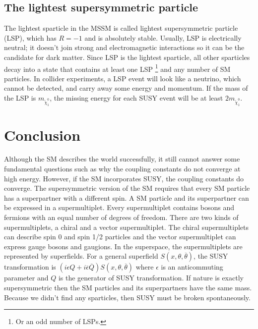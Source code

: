 \documentclass[12pt]{report}
\begin{document}
\section{The lightest supersymmetric particle}
The lightest sparticle in the MSSM is called lightest supersymmetric particle (LSP), which has $R = -1$ and is absolutely stable.
Usually, LSP is electrically neutral; it doesn't join strong and electromagnetic interactions so it can be the candidate for dark matter.
Since LSP is the lightest sparticle, all other sparticles decay into a state that contains at least one LSP \footnote{Or an odd number of LSPs.} and any number of SM particles.
In collider experiments, a LSP event will look like a neutrino, which cannot be detected, and carry away some energy and momentum.
If the mass of the LSP is $m_{\widetilde{\chi}^{0}_{1}}$, the missing energy for each SUSY event will be at least $2 m_{\widetilde{\chi}^{0}_{1}}$. %













\chapter{Conclusion}
Although the SM describes the world successfully, it still cannot answer some fundamental questions such as why the coupling constants do not converge at high energy.
However, if the SM incorporates SUSY, the coupling constants do converge.
The supersymmetric version of the SM requires that every SM particle has a superpartner with a different spin.
A SM particle and its superpartner can be expressed in a supermultiplet.
Every supermultiplet contains bosons and fermions with an equal number of degrees of freedom.
There are two kinds of supermultiplets, a chiral and a vector supermultiplet.
The chiral supermultiplets can describe spin 0 and spin 1/2 particles and the vector supermultiplet can express gauge bosons and gaugions.
In the superspace, the supermultiplets are represented by superfields.
For a general superfield $S(x, \theta, \overline{\theta})$, the SUSY transformation is $(i \epsilon Q + i \overline{\epsilon} \overline{Q}) S(x, \theta, \overline{\theta})$ where $\epsilon$ is an anticommuting parameter and $Q$ is the generator of SUSY transformation.
If nature is exactly supersymmetric then the SM particles and its superpartners have the same mass.
Because we didn't find any sparticles, then SUSY must be broken spontaneously.
\end{document}
